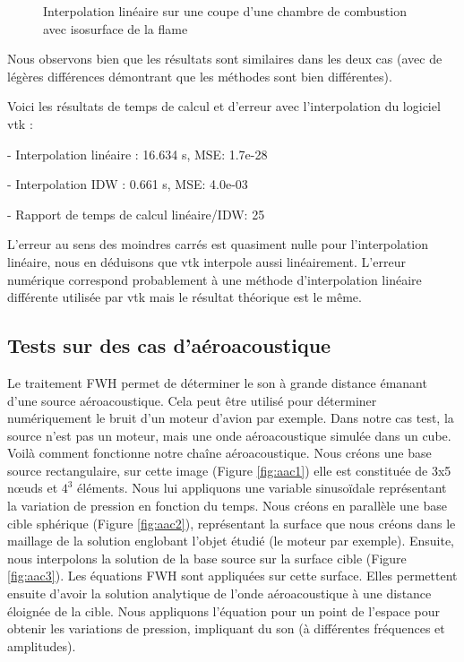 \begin{figure}[H]
\begin{minipage}[b]{0.47\textwidth}
        \caption{Interpolation linéaire sur une coupe d'une chambre de combustion avec isosurface de la flame}
        \label{fig:cb-lineaire}
    \end{minipage}
\end{figure}


Nous observons bien que les résultats sont similaires dans les deux cas (avec de légères différences démontrant que les méthodes sont bien différentes).

Voici les résultats de temps de calcul et d'erreur avec l'interpolation du logiciel vtk :

- Interpolation linéaire :         16.634 s, MSE: 1.7e-28

\vspace{-0,2cm}

- Interpolation IDW :\hspace{0,4cm} 0.661 s, MSE: 4.0e-03

\vspace{-0,2cm}

- Rapport de temps de calcul linéaire/IDW: 25

L'erreur au sens des moindres carrés est quasiment nulle pour l'interpolation linéaire, nous en déduisons que vtk interpole aussi linéairement. L'erreur numérique correspond probablement à une méthode d'interpolation linéaire différente utilisée par vtk mais le résultat théorique est le même.

\subsection{Tests sur des cas d'aéroacoustique}\label{s241}

Le traitement FWH permet de déterminer le son à grande distance émanant d'une source aéroacoustique. Cela peut être utilisé pour déterminer numériquement le bruit d'un moteur d'avion par exemple.
Dans notre cas test, la source n'est pas un moteur, mais une onde aéroacoustique simulée dans un cube.
Voilà comment fonctionne notre chaîne aéroacoustique.\label{s243}
Nous créons une base source rectangulaire, sur cette image (Figure \ref{fig:aac1}) elle est constituée de 3x5 nœuds et $4^3$ éléments.
Nous lui appliquons une variable sinusoïdale représentant la variation de pression en fonction du temps.
Nous créons en parallèle une base cible sphérique (Figure \ref{fig:aac2}), représentant la surface que nous créons dans le maillage de la solution englobant l'objet étudié (le moteur par exemple).
Ensuite, nous interpolons la solution de la base source sur la surface cible (Figure \ref{fig:aac3}).
Les équations FWH sont appliquées sur cette surface. Elles permettent ensuite d'avoir la solution analytique de l'onde aéroacoustique à une distance éloignée de la cible. Nous appliquons l'équation pour un point de l'espace pour obtenir les variations de pression, impliquant du son (à différentes fréquences et amplitudes).

